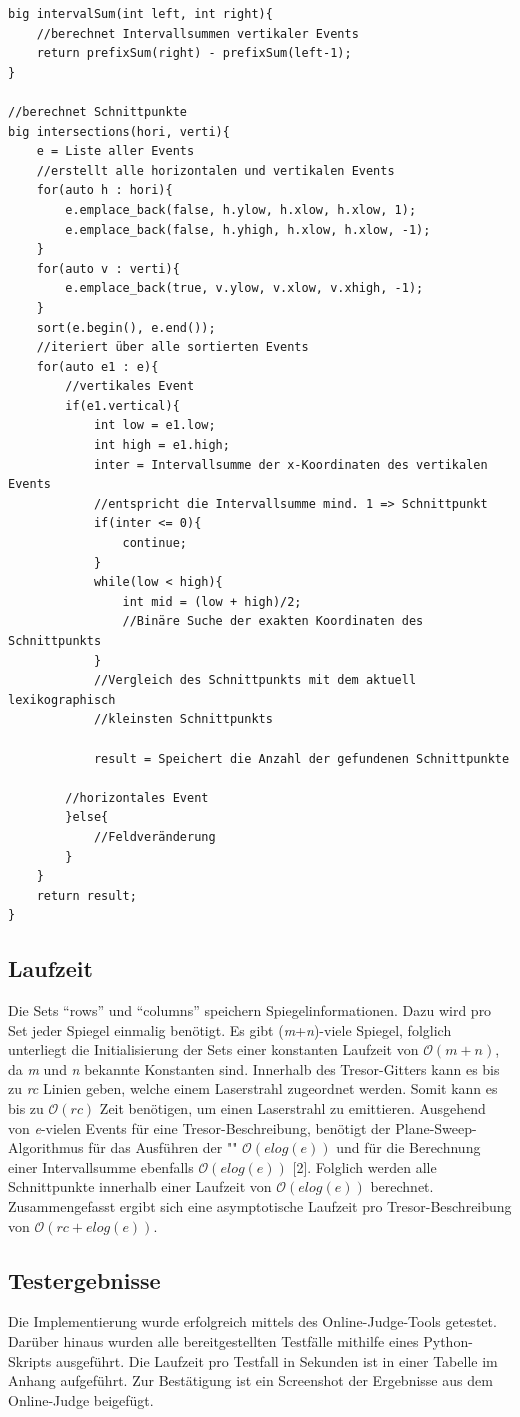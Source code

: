 \begin{lstlisting}
big intervalSum(int left, int right){
    //berechnet Intervallsummen vertikaler Events
    return prefixSum(right) - prefixSum(left-1);
}

//berechnet Schnittpunkte 
big intersections(hori, verti){
    e = Liste aller Events
    //erstellt alle horizontalen und vertikalen Events
    for(auto h : hori){
        e.emplace_back(false, h.ylow, h.xlow, h.xlow, 1);
        e.emplace_back(false, h.yhigh, h.xlow, h.xlow, -1);
    }
    for(auto v : verti){
        e.emplace_back(true, v.ylow, v.xlow, v.xhigh, -1);
    }
    sort(e.begin(), e.end());
    //iteriert über alle sortierten Events
    for(auto e1 : e){
        //vertikales Event
        if(e1.vertical){
            int low = e1.low;
            int high = e1.high;
            inter = Intervallsumme der x-Koordinaten des vertikalen Events
            //entspricht die Intervallsumme mind. 1 => Schnittpunkt
            if(inter <= 0){
                continue;
            }
            while(low < high){
                int mid = (low + high)/2;
                //Binäre Suche der exakten Koordinaten des Schnittpunkts
            }
            //Vergleich des Schnittpunkts mit dem aktuell lexikographisch 
            //kleinsten Schnittpunkts
                     
            result = Speichert die Anzahl der gefundenen Schnittpunkte

        //horizontales Event
        }else{
            //Feldveränderung
        }
    }
    return result;
}   
\end{lstlisting}
%
\subsection{Laufzeit}
\label{subsec:TextBefehle}
Die Sets “rows” und “columns” speichern Spiegelinformationen. Dazu wird pro Set jeder Spiegel einmalig benötigt. Es gibt (\textit{m}+\textit{n})-viele Spiegel, folglich unterliegt die Initialisierung der Sets einer konstanten Laufzeit von $\mathcal{O}(m+n)$, da \textit{m} und \textit{n} bekannte Konstanten sind. Innerhalb des Tresor-Gitters kann es bis zu \textit{rc} Linien geben, welche einem Laserstrahl zugeordnet werden. Somit kann es bis zu $\mathcal{O}(rc)$ Zeit benötigen, um einen Laserstrahl zu emittieren. Ausgehend von \textit{e}-vielen Events für eine Tresor-Beschreibung, benötigt der Plane-Sweep-Algorithmus für das Ausführen der "" $\mathcal{O}(elog(e))$ und für die Berechnung einer Intervallsumme ebenfalls $\mathcal{O}(elog(e))$ [2]. Folglich werden alle Schnittpunkte innerhalb einer Laufzeit von $\mathcal{O}(elog(e))$ berechnet. Zusammengefasst ergibt sich eine asymptotische Laufzeit pro Tresor-Beschreibung von $\mathcal{O}(rc+elog(e))$. 
\subsection{Testergebnisse}
\label{subsec:TextBefehle}
Die Implementierung wurde erfolgreich mittels des Online-Judge-Tools getestet. Darüber hinaus wurden alle bereitgestellten Testfälle mithilfe eines Python-Skripts ausgeführt. Die Laufzeit pro Testfall in Sekunden ist in einer Tabelle im Anhang aufgeführt. Zur Bestätigung ist ein Screenshot der Ergebnisse aus dem Online-Judge beigefügt.
%